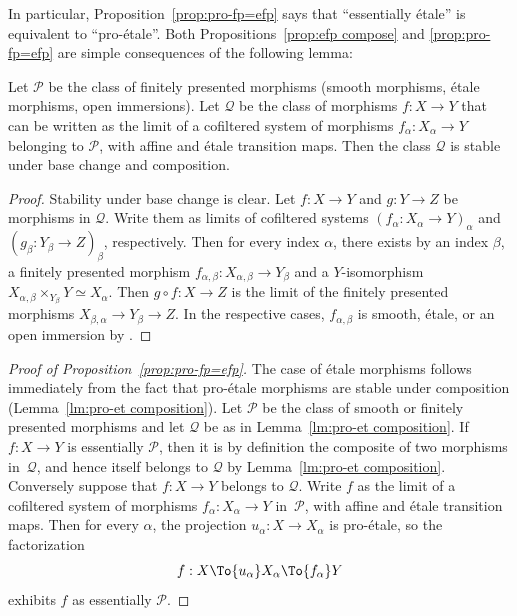 In particular, Proposition~\ref{prop:pro-fp=efp} says that ``essentially étale'' is equivalent to ``pro-étale''.
Both Propositions~\ref{prop:efp compose} and \ref{prop:pro-fp=efp} are simple consequences of the following lemma:

\begin{lm}\label{lm:pro-et composition}
Let $\mathcal{P}$ be the class of finitely presented morphisms (\resp smooth morphisms, étale morphisms, open immersions).
Let $\mathcal{Q}$ be the class of morphisms \hbox{$f : X \to Y$} that can be written as the limit of a cofiltered system of morphisms $f_\alpha : X_\alpha \to Y$ belonging to $\mathcal{P}$, with affine and étale transition maps.
Then the class $\mathcal{Q}$ is stable under base change and composition.
\end{lm}
\begin{proof}
Stability under base change is clear.
Let $f : X \to Y$ and $g : Y \to Z$ be morphisms in $\mathcal{Q}$.
Write them as limits of cofiltered systems $(f_\alpha : X_\alpha \to Y)_\alpha$ and $(g_\beta : Y_\beta \to Z)_\beta$, respectively.
Then for every index $\alpha$, there exists by \cite[Th.\,8.8.2(ii)]{EGA4} an index $\beta$, a finitely presented morphism $f_{\alpha,\beta} : X_{\alpha,\beta} \to Y_\beta$ and a $Y$\nobreakdash-isomorphism $X_{\alpha,\beta} \times_{Y_\beta} Y \simeq X_\alpha$.
Then $g\circ f : X \to Z$ is the limit of the finitely presented morphisms $X_{\beta,\alpha} \to Y_\beta \to Z$.
In the respective cases, $f_{\alpha,\beta}$ is smooth, étale, or an open immersion by \cite[Prop.\,17.7.8 or Prop.\,8.6.3]{EGA4}.
\end{proof}

\begin{proof}[Proof of Proposition~\ref{prop:pro-fp=efp}]
The case of étale morphisms follows immediately from the fact that pro-étale morphisms are stable under composition (Lemma~\ref{lm:pro-et composition}).
Let $\mathcal{P}$ be the class of smooth or finitely presented morphisms and let $\mathcal{Q}$ be as in Lemma~\ref{lm:pro-et composition}.
If~$f : X \to Y$ is essentially $\mathcal{P}$, then it is by definition the composite of two morphisms in~$\mathcal{Q}$, and hence itself belongs to $\mathcal{Q}$ by Lemma~\ref{lm:pro-et composition}.
Conversely suppose that \hbox{$f : X \to Y$} belongs to $\mathcal{Q}$.
Write $f$ as the limit of a cofiltered system of morphisms $f_\alpha : X_\alpha \to Y$ in~$\mathcal{P}$, with affine and étale transition maps.
Then for every $\alpha$, the projection \hbox{$u_\alpha : X \to X_\alpha$} is pro-étale, so the factorization
\[
f : X \To{u_\alpha} X_\alpha \To{f_\alpha} Y
\]
exhibits $f$ as essentially $\mathcal{P}$.
\end{proof}

